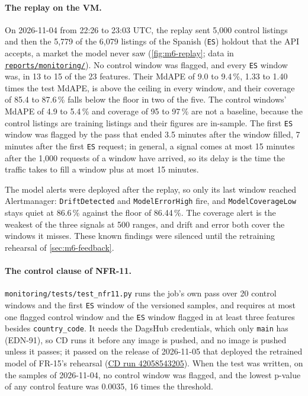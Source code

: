 \paragraph{The replay on the VM.}
On 2026-11-04 from 22:26 to 23:03 UTC, the replay sent 5,000 control listings and then the 5,779 of the 6,079 listings of the Spanish (\texttt{ES}) holdout that the API accepts, a market the model never saw (\cref{fig:m6-replay}; data in \href{https://github.com/mlops-2627q1-mds-upc/MLOPS_Recommenditos/blob/main/reports/monitoring/vm-es-replay-2026-11-04.md}{\texttt{reports/monitoring/}}).
No control window was flagged, and every \texttt{ES} window was, in 13 to 15 of the 23 features.
Their MdAPE of 9.0 to 9.4\,\%, 1.33 to 1.40 times the test MdAPE, is above the ceiling in every window, and their coverage of 85.4 to 87.6\,\% falls below the floor in two of the five.
The control windows' MdAPE of 4.9 to 5.4\,\% and coverage of 95 to 97\,\% are not a baseline, because the control listings are training listings and their figures are in-sample.
The first \texttt{ES} window was flagged by the pass that ended 3.5 minutes after the window filled, 7 minutes after the first \texttt{ES} request; in general, a signal comes at most 15 minutes after the 1,000 requests of a window have arrived, so its delay is the time the traffic takes to fill a window plus at most 15 minutes.

The model alerts were deployed after the replay, so only its last window reached Alertmanager: \texttt{DriftDetected} and \texttt{ModelErrorHigh} fire, and \texttt{ModelCoverageLow} stays quiet at 86.6\,\% against the floor of 86.44\,\%.
The coverage alert is the weakest of the three signals at 500 ranges, and drift and error both cover the windows it misses.
These known findings were silenced until the retraining rehearsal of \cref{sec:m6-feedback}.

\paragraph{The control clause of NFR-11.}
\texttt{monitoring/tests/test\_nfr11.py} runs the job's own pass over 20 control windows and the first \texttt{ES} window of the versioned samples, and requires at most one flagged control window and the \texttt{ES} window flagged in at least three features besides \texttt{country\_code}.
It needs the DagsHub credentials, which only \texttt{main} has (EDN-91), so CD runs it before any image is pushed, and no image is pushed unless it passes; it passed on the release of 2026-11-05 that deployed the retrained model of FR-15's rehearsal (\href{https://github.com/mlops-2627q1-mds-upc/MLOPS_Recommenditos/actions/runs/42058543205}{CD run 42058543205}).
When the test was written, on the samples of 2026-11-04, no control window was flagged, and the lowest p-value of any control feature was 0.0035, 16 times the threshold.

